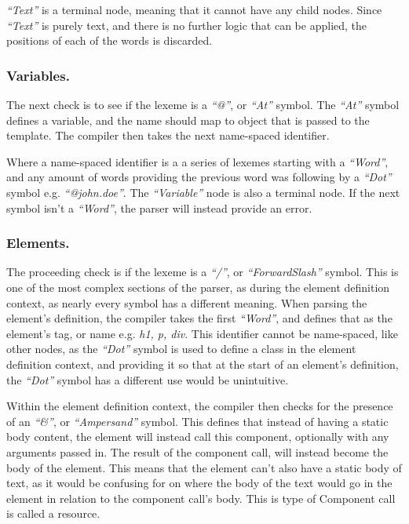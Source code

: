 \textit{``Text''} is a terminal node, meaning that it cannot have any child nodes. Since \textit{``Text''} is purely text, and there is no further logic that can be applied, the positions of each of the words is discarded.

\subsubsection{Variables.}
The next check is to see if the lexeme is a \textit{``@''}, or \textit{``At''} symbol. The \textit{``At''} symbol defines a variable, and the name should map to  object that is passed to the template. The compiler then takes the next name-spaced identifier.

Where a name-spaced identifier is a a series of lexemes starting with a \textit{``Word''}, and any amount of words providing the previous word was following by a   \textit{``Dot''} symbol e.g. \textit{``@john.doe''}. The \textit{``Variable''} node is also a terminal node. If the next symbol isn't a \textit{``Word''}, the parser will instead provide an error.

\subsubsection{Elements.}
The proceeding check is if the lexeme is a \textit{``/''}, or \textit{``ForwardSlash''} symbol. This is one of the most complex sections of the parser, as during the element definition context, as nearly every symbol has a different meaning. When parsing the element's definition, the compiler takes the first \textit{``Word''}, and defines that as the element's tag, or name e.g. \textit{h1, p, div}. 
\newpage
This identifier cannot be name-spaced, like other nodes, as the  \textit{``Dot''} symbol is used to define a class in the element definition context, and providing it so that at the start of an element's definition, the \textit{``Dot''} symbol has a different use would be unintuitive. 

Within the element definition context, the compiler then checks for the presence of an \textit{``\&''}, or \textit{``Ampersand''} symbol. This defines that instead of having a static body content, the element will instead call this component, optionally with any arguments passed in. The result of the component call, will instead become the body of the element. This means that the element can't also have a static body of text, as it would be confusing for \you{} on where the body of the text would go in the element in relation to the component call's body. This is type of Component call is called a resource.

